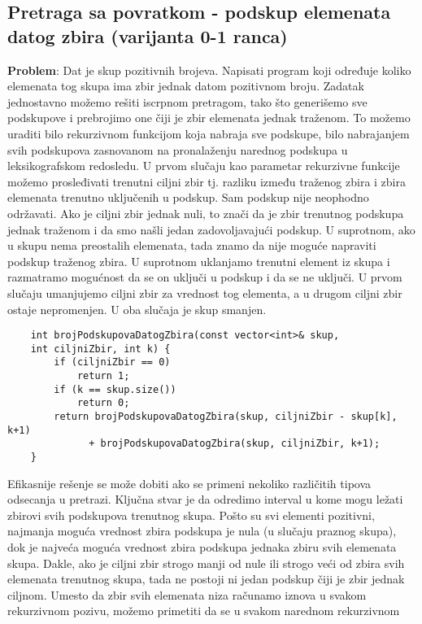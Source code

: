 \documentclass{article}
\begin{document}
\subsection{Pretraga sa povratkom - podskup elemenata datog zbira (varijanta 0-1 ranca)}
\textbf{Problem}: Dat je skup pozitivnih brojeva. Napisati program koji određuje
koliko elemenata tog skupa ima zbir jednak datom pozitivnom broju.
\newline
Zadatak jednostavno možemo rešiti iscrpnom pretragom, tako što generišemo
sve podskupove i prebrojimo one čiji je zbir elemenata jednak traženom. To
možemo uraditi bilo rekurzivnom funkcijom koja nabraja sve podskupe, bilo
nabrajanjem svih podskupova zasnovanom na pronalaženju narednog podskupa
u leksikografskom redosledu. U prvom slučaju kao parametar rekurzivne funkcije
možemo prosleđivati trenutni ciljni zbir tj. razliku između traženog zbira i
zbira elemenata trenutno uključenih u podskup. Sam podskup nije neophodno
održavati. Ako je ciljni zbir
jednak nuli, to znači da je zbir trenutnog podskupa jednak traženom i da smo
našli jedan zadovoljavajući podskup. U suprotnom, ako u skupu nema preostalih
elemenata, tada znamo da nije moguće napraviti podskup traženog zbira. U
suprotnom uklanjamo trenutni element iz skupa i razmatramo mogućnost da
se on uključi u podskup i da se ne uključi. U prvom slučaju umanjujemo ciljni
zbir za vrednost tog elementa, a u drugom ciljni zbir ostaje nepromenjen. U oba
slučaja je skup smanjen.
\begin{lstlisting}
    int brojPodskupovaDatogZbira(const vector<int>& skup, 
    int ciljniZbir, int k) {
        if (ciljniZbir == 0)
            return 1;
        if (k == skup.size())
            return 0;
        return brojPodskupovaDatogZbira(skup, ciljniZbir - skup[k], k+1) 
              + brojPodskupovaDatogZbira(skup, ciljniZbir, k+1);
    }
\end{lstlisting}
Efikasnije rešenje se može dobiti ako se primeni nekoliko različitih
tipova odsecanja u pretrazi. Ključna stvar je da odredimo interval u kome mogu
ležati zbirovi svih podskupova trenutnog skupa. Pošto su svi elementi pozitivni,
najmanja moguća vrednost zbira podskupa je nula (u slučaju praznog skupa),
dok je najveća moguća vrednost zbira podskupa jednaka zbiru svih elemenata
skupa. Dakle, ako je ciljni zbir strogo manji od nule ili strogo veći od zbira
svih elemenata trenutnog skupa, tada ne postoji ni jedan podskup čiji je zbir
jednak ciljnom. Umesto da zbir svih elemenata niza računamo iznova u svakom
rekurzivnom pozivu, možemo primetiti da se u svakom narednom rekurzivnom
\end{document}
